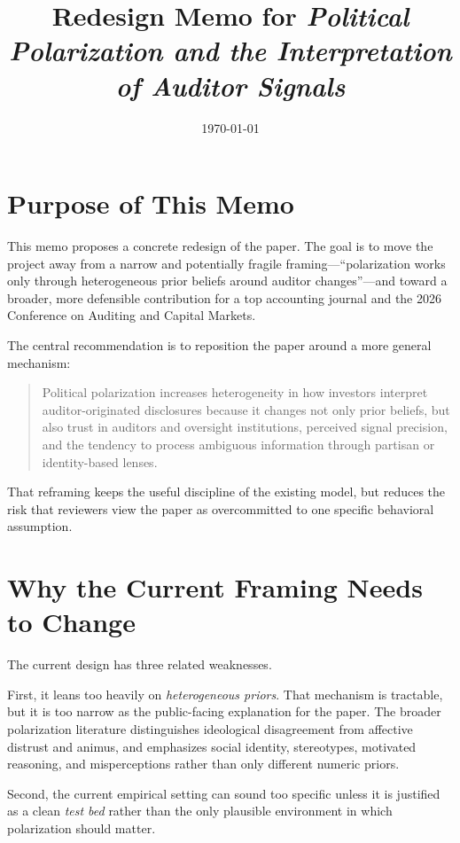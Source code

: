 \documentclass[12pt]{article}
\title{Redesign Memo for \textit{Political Polarization and the Interpretation of Auditor Signals}}
\author{}
\date{\today}
\begin{document}
\maketitle

\section{Purpose of This Memo}

This memo proposes a concrete redesign of the paper. The goal is to move the project away from a narrow and potentially fragile framing---``polarization works only through heterogeneous prior beliefs around auditor changes''---and toward a broader, more defensible contribution for a top accounting journal and the 2026 Conference on Auditing and Capital Markets.

The central recommendation is to reposition the paper around a more general mechanism:

\begin{quote}
Political polarization increases heterogeneity in how investors interpret auditor-originated disclosures because it changes not only prior beliefs, but also trust in auditors and oversight institutions, perceived signal precision, and the tendency to process ambiguous information through partisan or identity-based lenses.
\end{quote}

That reframing keeps the useful discipline of the existing model, but reduces the risk that reviewers view the paper as overcommitted to one specific behavioral assumption.

\section{Why the Current Framing Needs to Change}

The current design has three related weaknesses.

First, it leans too heavily on \emph{heterogeneous priors}. That mechanism is tractable, but it is too narrow as the public-facing explanation for the paper. The broader polarization literature distinguishes ideological disagreement from affective distrust and animus, and emphasizes social identity, stereotypes, motivated reasoning, and misperceptions rather than only different numeric priors.

Second, the current empirical setting can sound too specific unless it is justified as a clean \emph{test bed} rather than the only plausible environment in which polarization should matter.
\end{document}
